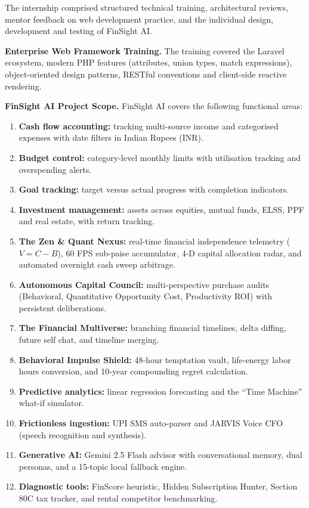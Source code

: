 \documentclass[12pt,a4paper]{report}
\begin{document}
The internship comprised structured technical training, architectural reviews, mentor feedback on web development practice, and the individual design, development and testing of FinSight AI.

\textbf{Enterprise Web Framework Training.}
The training covered the Laravel ecosystem, modern PHP features (attributes, union types, match expressions), object-oriented design patterns, RESTful conventions and client-side reactive rendering.

\textbf{FinSight AI Project Scope.}
FinSight AI covers the following functional areas:
\begin{enumerate}[leftmargin=*]
    \item \textbf{Cash flow accounting:} tracking multi-source income and categorised expenses with date filters in Indian Rupees (INR).
    \item \textbf{Budget control:} category-level monthly limits with utilisation tracking and overspending alerts.
    \item \textbf{Goal tracking:} target versus actual progress with completion indicators.
    \item \textbf{Investment management:} assets across equities, mutual funds, ELSS, PPF and real estate, with return tracking.
    \item \textbf{The Zen \& Quant Nexus:} real-time financial independence telemetry ($V = C - B$), 60 FPS sub-paise accumulator, 4-D capital allocation radar, and automated overnight cash sweep arbitrage.
    \item \textbf{Autonomous Capital Council:} multi-perspective purchase audits (Behavioral, Quantitative Opportunity Cost, Productivity ROI) with persistent deliberations.
    \item \textbf{The Financial Multiverse:} branching financial timelines, delta diffing, future self chat, and timeline merging.
    \item \textbf{Behavioral Impulse Shield:} 48-hour temptation vault, life-energy labor hours conversion, and 10-year compounding regret calculation.
    \item \textbf{Predictive analytics:} linear regression forecasting and the ``Time Machine'' what-if simulator.
    \item \textbf{Frictionless ingestion:} UPI SMS auto-parser and JARVIS Voice CFO (speech recognition and synthesis).
    \item \textbf{Generative AI:} Gemini 2.5 Flash advisor with conversational memory, dual personas, and a 15-topic local fallback engine.
    \item \textbf{Diagnostic tools:} FinScore heuristic, Hidden Subscription Hunter, Section 80C tax tracker, and rental competitor benchmarking.
\end{enumerate}
\end{document}
